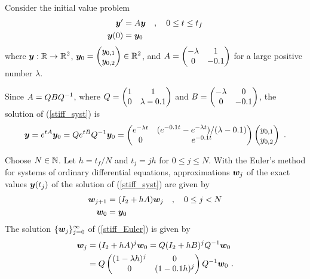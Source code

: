 \begin{egg}
Consider the initial value problem
\begin{equation}\label{stiff_syst}
\begin{split}
\bm{y}' &= A \bm{y} \quad , \quad 0 \leq t \leq t_f \\
\bm{y}(0) &= \bm{y}_0
\end{split}
\end{equation}
where $\displaystyle \bm{y}:\mathbb{R}\rightarrow \mathbb{R}^2$,
$\displaystyle \bm{y}_0 =  \begin{pmatrix} y_{0,1} \\ y_{0,2}
\end{pmatrix} \in \mathbb{R}^2$, and
$\displaystyle A = \begin{pmatrix} -\lambda & 1 \\
0 & -0.1 \end{pmatrix}$ for a large positive number $\lambda$.

Since $\displaystyle A = Q B Q^{-1}$, where
$\displaystyle Q=\begin{pmatrix} 1 & 1 \\
0 & \lambda -0.1 \end{pmatrix}$ and
$\displaystyle B=\begin{pmatrix} -\lambda & 0 \\
0 & -0.1 \end{pmatrix}$, the solution of (\ref{stiff_syst}) is
\begin{equation}\label{sol_stiff_syst}
\bm{y} = e^{tA}\bm{y}_0 = Q e^{tB} Q^{-1} \bm{y}_0
= \begin{pmatrix}
e^{-\lambda t} &
\displaystyle (e^{-0.1 t}-e^{-\lambda t})/(\lambda-0.1) \\
0 & e^{-0.1 t}
\end{pmatrix}
\begin{pmatrix}
y_{0,1} \\ y_{0,2}
\end{pmatrix} \ .
\end{equation}

Choose $N \in \mathbb{N}$.  Let $h=t_f/N$ and $t_j = jh$ for $0 \leq j \leq N$.
With the Euler's method for systems of ordinary
differential equations, approximations $\bm{w}_j$ of the exact
values $\bm{y}(t_j)$ of the solution of (\ref{stiff_syst}) are given
by
\begin{equation}
\label{stiff_Euler}
\begin{split}
\bm{w}_{j+1} &= (I_2 + hA)\bm{w}_j \quad , \quad 0 \leq j < N \\
\bm{w}_0 &= \bm{y}_0
\end{split}
\end{equation}
The solution
$\displaystyle \{\bm{w}_j\}_{j=0}^\infty$ of (\ref{stiff_Euler}) is
given by
\begin{equation} \label{sol_stiff_Euler}
\begin{split}
\bm{w}_j &= (I_2+hA)^j \bm{w}_0 = Q(I_2+hB)^j Q^{-1}\bm{w}_0 \\
&= Q \begin{pmatrix}
(1-\lambda h)^j & 0 \\
0 & (1-0.1 h)^j
\end{pmatrix}
Q^{-1} \bm{w}_0 \ .
\end{split}
\end{equation}


\end{egg}
